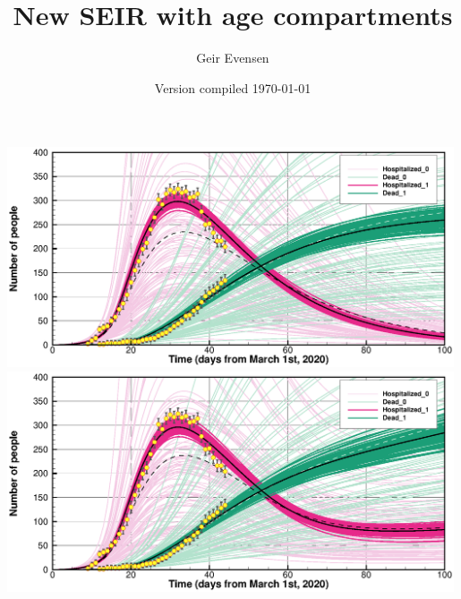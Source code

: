 \documentclass[twoside,11pt]{article}
\begin{document}
\setlength{\parskip}{3mm} 

\title{New SEIR with age compartments }
\author{Geir Evensen}

\date{Version compiled \today}

\maketitle

\begin{center}
\includegraphics[width=0.99\textwidth]{ClosedHD.eps} \\
\includegraphics[width=0.99\textwidth]{OpenHD.eps} 
\end{center}
\newpage
\end{document}
